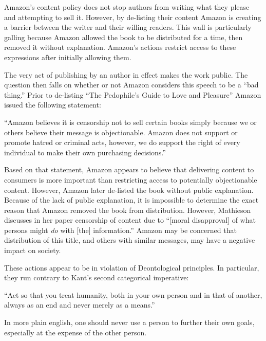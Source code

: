 \documentclass[11pt]{article}
\begin{document}
\begin{multicols}{2}
Amazon's content policy does not stop authors from writing what they please and attempting to sell it.  However, by de-listing their content Amazon is creating a barrier between the writer and their willing readers.  This wall is particularly galling because Amazon allowed the book to be distributed for a time, then removed it without explanation.  Amazon's actions restrict access to these expressions after initially allowing them.

The very act of publishing by an author in effect makes the work public.  The question then falls on whether or not Amazon considers this speech to be a ``bad thing.''  Prior to de-listing ``The Pedophile's Guide to Love and Pleasure'' Amazon issued the following statement:

{\addtolength{\leftskip}{6mm}

``Amazon believes it is censorship not to sell certain books simply because we or others believe their message is objectionable.  Amazon does not support or promote hatred or criminal acts, however, we do support the right of every individual to make their own purchasing decisions.'' \cite{TechCrunchAmazonCensorship}

}

Based on that statement, Amazon appears to believe that delivering content to consumers is more important than restricting access to potentially objectionable content. However, Amazon later de-listed the book without public explanation.  Because of the lack of public explanation, it is impossible to determine the exact reason that Amazon removed the book from distribution.  However, Mathieson discusses in her paper censorship of content due to ``[moral disapproval] of what persons might \emph{do} with [the] information.'' \cite{MathiesenCensorship} Amazon may be concerned that distribution of this title, and others with similar messages, may have a negative impact on society.

These actions appear to be in violation of Deontological principles.  In particular, they run contrary to Kant's second categorical imperative:

{\addtolength{\leftskip}{6mm}

``Act so that you treat humanity, both in your own person and in that of another, always as an end and never merely as a means.'' \cite{KantCategorical}

}

In more plain english, one should never use a person to further their own goals, especially at the expense of the other person. 


\end{multicols}
\end{document}
